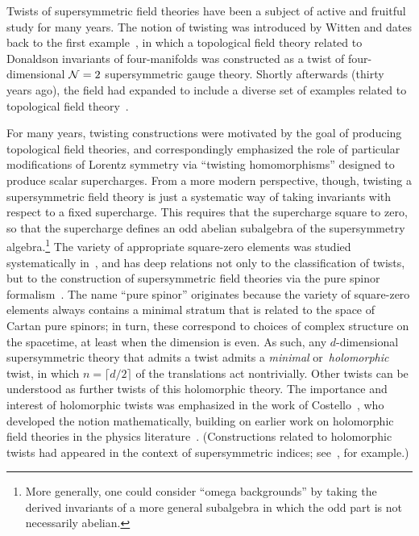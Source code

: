 %
%
%
%
%
%
%

Twists of supersymmetric field theories have been a subject of active and fruitful study for many years. 
The notion of twisting was introduced by Witten and dates back to the first example~\cite{WittenTwist}, in which a topological field theory related to Donaldson invariants of four-manifolds was constructed as a twist of four-dimensional $\mathcal N=2$ supersymmetric gauge theory.
Shortly afterwards (thirty years ago), the field had expanded to include a diverse set of examples related to topological field theory~\cite{BlauThompson}. 

For many years, twisting constructions were motivated by the goal of producing topological field theories, and correspondingly emphasized the role of particular modifications of  Lorentz symmetry via ``twisting homomorphisms'' designed to produce scalar supercharges.
From a more modern perspective, though, twisting a supersymmetric field theory is just a systematic way of taking invariants with respect to a fixed supercharge. This requires that the supercharge square to zero, so that the supercharge defines an odd abelian subalgebra of the supersymmetry algebra.\footnote{More generally, one could consider ``omega backgrounds'' by taking the derived invariants of a more general subalgebra in which the odd part is not necessarily abelian.}
The variety of appropriate square-zero elements was studied systematically in~\cite{NV}, and has deep relations not only to the  classification of  twists, but to the construction  of supersymmetric field theories via the pure spinor formalism~\cite{Cederwall,EHSW}. The name ``pure spinor'' originates because the  variety of  square-zero elements always contains a minimal stratum that is related to the space of Cartan pure spinors; in turn, these correspond to choices of complex structure on the  spacetime, at least when the dimension is even. 
As such, any $d$-dimensional  supersymmetric theory that admits a twist admits a \emph{minimal} or~\emph{holomorphic} twist, in which $n=\lceil d/2\rceil$ of the translations act nontrivially. Other twists can be understood as further twists of this holomorphic theory.
The importance and interest of holomorphic twists was emphasized in the work of Costello~\cite{CostelloHol}, who developed the notion mathematically, building on earlier work on holomorphic field theories in the physics literature~\cite{NekThesis}. (Constructions related to holomorphic twists had appeared in the context of supersymmetric indices; see~\cite{Romelsberger}, for example.) 


